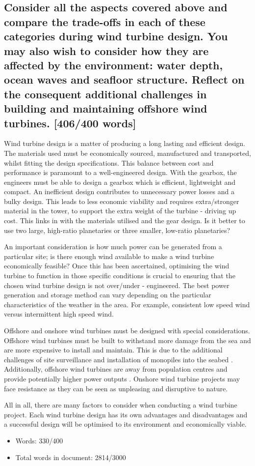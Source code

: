 \documentclass[12pt]{article}
\numberwithin{equation}{section}
\begin{document}
\begin{flushleft}
\subsection*{Consider all the aspects covered above and compare the trade-offs in each of these categories during wind turbine design. You may also wish to consider how they are affected by the environment: water depth, ocean waves and seafloor structure. Reflect on the consequent additional challenges in building and maintaining offshore wind turbines. [406/400 words]}
Wind turbine design is a matter of producing a long lasting and efficient design. The materials used must be economically sourced, manufactured and transported, whilst fitting the design specifications. This balance between cost and performance is paramount to a well-engineered design. With the gearbox, the engineers must be able to design a gearbox which is efficient, lightweight and compact. An inefficient design contributes to unnecessary power losses and a bulky design. This leads to less economic viability and requires extra/stronger material in the tower, to support the extra weight of the turbine - driving up cost. This links in with the materials utilised and the gear design. Is it better to use two large, high-ratio planetaries or three smaller, low-ratio planetaries? 

An important consideration is how much power can be generated from a particular site; is there enough wind available to make a wind turbine economically feasible? Once this has been ascertained, optimising the wind turbine to function in those specific conditions is crucial to ensuring that the chosen wind turbine design is not over/under - engineered. The best power generation and storage method can vary depending on the particular characteristics of the weather in the area. For example, consistent low speed wind versus intermittent high speed wind. 

Offshore and onshore wind turbines must be designed with special considerations. Offshore wind turbines must be built to withstand more damage from the sea and are more expensive to install and maintain. This is due to the additional challenges of site surveillance and installation of monopiles into the seabed \citep{monopile}. Additionally, offshore wind turbines are away from population centres and provide potentially higher power outputs \citep{offshorePower}. Onshore wind turbine projects may face resistance as they can be seen as unpleasing and disruptive to nature.

All in all, there are many factors to consider when conducting a wind turbine project. Each wind turbine design has its own advantages and disadvantages and a successful design will be optimised to its environment and economically viable. 

\begin{itemize}
  \item Words: 330/400
  \item Total words in document: 2814/3000
\end{itemize}


\end{flushleft}
\end{document}
